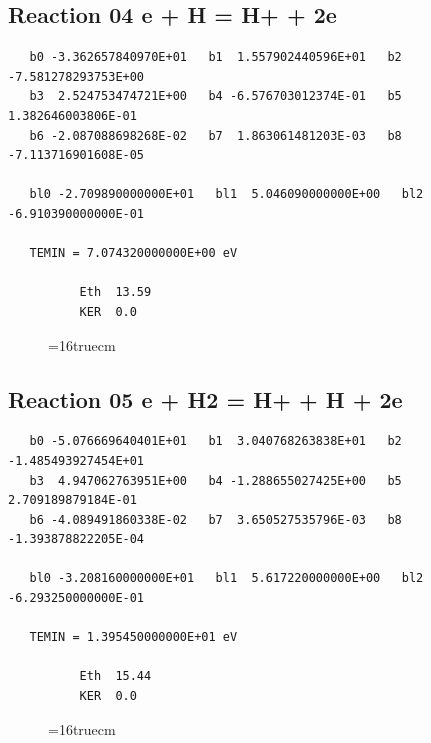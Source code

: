 \documentclass[12pt,dvipdfm]{article}
\begin{document}
\subsection{
Reaction 04 e + H = H+ + 2e }
\begin{small}\begin{verbatim}
   b0 -3.362657840970E+01   b1  1.557902440596E+01   b2 -7.581278293753E+00
   b3  2.524753474721E+00   b4 -6.576703012374E-01   b5  1.382646003806E-01
   b6 -2.087088698268E-02   b7  1.863061481203E-03   b8 -7.113716901608E-05

   bl0 -2.709890000000E+01   bl1  5.046090000000E+00   bl2 -6.910390000000E-01

   TEMIN = 7.074320000000E+00 eV

          Eth  13.59
          KER  0.0
\end{verbatim}\end{small}
\begin{figure}[h!] \label{n2rates}
\epsfxsize=16truecm
\end{figure}
\newpage

\subsection{
Reaction 05 e + H2 = H+ + H + 2e }
\begin{small}\begin{verbatim}
   b0 -5.076669640401E+01   b1  3.040768263838E+01   b2 -1.485493927454E+01
   b3  4.947062763951E+00   b4 -1.288655027425E+00   b5  2.709189879184E-01
   b6 -4.089491860338E-02   b7  3.650527535796E-03   b8 -1.393878822205E-04

   bl0 -3.208160000000E+01   bl1  5.617220000000E+00   bl2 -6.293250000000E-01

   TEMIN = 1.395450000000E+01 eV

          Eth  15.44
          KER  0.0
\end{verbatim}\end{small}
\begin{figure}[h!] \label{n2rates}
\epsfxsize=16truecm
\end{figure}
\newpage
\end{document}
